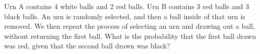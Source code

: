 Urn A contains 4 white balls and 2 red balls. Urn B contains 3 red balls and 3 black balls. An urn is randomly selected, and then a ball inside of that urn is removed. We then repeat the process of selecting an urn and drawing out a ball, without returning the first ball. What is the probability that the first ball drawn was red, given that the second ball drawn was black?